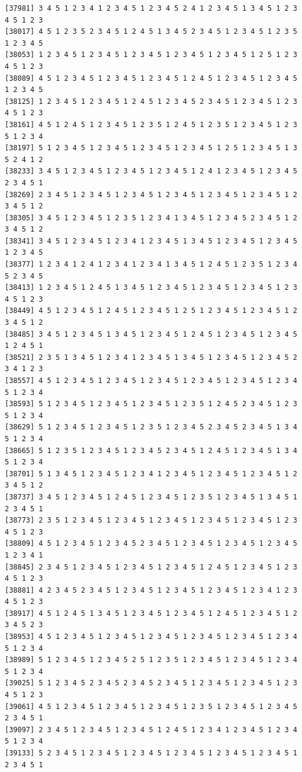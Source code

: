 \documentclass[
  english,
]{book}
\begin{document}
\begin{verbatim}
[37981] 3 4 5 1 2 3 4 1 2 3 4 5 1 2 3 4 5 2 4 1 2 3 4 5 1 3 4 5 1 2 3 4 5 1 2 3
[38017] 4 5 1 2 3 5 2 3 4 5 1 2 4 5 1 3 4 5 2 3 4 5 1 2 3 4 5 1 2 3 5 1 2 3 4 5
[38053] 1 2 3 4 5 1 2 3 4 5 1 2 3 4 5 1 2 3 4 5 1 2 3 4 5 1 2 5 1 2 3 4 5 1 2 3
[38089] 4 5 1 2 3 4 5 1 2 3 4 5 1 2 3 4 5 1 2 4 5 1 2 3 4 5 1 2 3 4 5 1 2 3 4 5
[38125] 1 2 3 4 5 1 2 3 4 5 1 2 4 5 1 2 3 4 5 2 3 4 5 1 2 3 4 5 1 2 3 4 5 1 2 3
[38161] 4 5 1 2 4 5 1 2 3 4 5 1 2 3 5 1 2 4 5 1 2 3 5 1 2 3 4 5 1 2 3 5 1 2 3 4
[38197] 5 1 2 3 4 5 1 2 3 4 5 1 2 3 4 5 1 2 3 4 5 1 2 5 1 2 3 4 5 1 3 5 2 4 1 2
[38233] 3 4 5 1 2 3 4 5 1 2 3 4 5 1 2 3 4 5 1 2 4 1 2 3 4 5 1 2 3 4 5 2 3 4 5 1
[38269] 2 3 4 5 1 2 3 4 5 1 2 3 4 5 1 2 3 4 5 1 2 3 4 5 1 2 3 4 5 1 2 3 4 5 1 2
[38305] 3 4 5 1 2 3 4 5 1 2 3 5 1 2 3 4 1 3 4 5 1 2 3 4 5 2 3 4 5 1 2 3 4 5 1 2
[38341] 3 4 5 1 2 3 4 5 1 2 3 4 1 2 3 4 5 1 3 4 5 1 2 3 4 5 1 2 3 4 5 1 2 3 4 5
[38377] 1 2 3 4 1 2 4 1 2 3 4 1 2 3 4 1 3 4 5 1 2 4 5 1 2 3 5 1 2 3 4 5 2 3 4 5
[38413] 1 2 3 4 5 1 2 4 5 1 3 4 5 1 2 3 4 5 1 2 3 4 5 1 2 3 4 5 1 2 3 4 5 1 2 3
[38449] 4 5 1 2 3 4 5 1 2 4 5 1 2 3 4 5 1 2 5 1 2 3 4 5 1 2 3 4 5 1 2 3 4 5 1 2
[38485] 3 4 5 1 2 3 4 5 1 3 4 5 1 2 3 4 5 1 2 4 5 1 2 3 4 5 1 2 3 4 5 1 2 4 5 1
[38521] 2 3 5 1 3 4 5 1 2 3 4 1 2 3 4 5 1 3 4 5 1 2 3 4 5 1 2 3 4 5 2 3 4 1 2 3
[38557] 4 5 1 2 3 4 5 1 2 3 4 5 1 2 3 4 5 1 2 3 4 5 1 2 3 4 5 1 2 3 4 5 1 2 3 4
[38593] 5 1 2 3 4 5 1 2 3 4 5 1 2 3 4 5 1 2 3 5 1 2 4 5 2 3 4 5 1 2 3 5 1 2 3 4
[38629] 5 1 2 3 4 5 1 2 3 4 5 1 2 3 5 1 2 3 4 5 2 3 4 5 2 3 4 5 1 3 4 5 1 2 3 4
[38665] 5 1 2 3 5 1 2 3 4 5 1 2 3 4 5 2 3 4 5 1 2 4 5 1 2 3 4 5 1 3 4 5 1 2 3 4
[38701] 5 1 3 4 5 1 2 3 4 5 1 2 3 4 1 2 3 4 5 1 2 3 4 5 1 2 3 4 5 1 2 3 4 5 1 2
[38737] 3 4 5 1 2 3 4 5 1 2 4 5 1 2 3 4 5 1 2 3 5 1 2 3 4 5 1 3 4 5 1 2 3 4 5 1
[38773] 2 3 5 1 2 3 4 5 1 2 3 4 5 1 2 3 4 5 1 2 3 4 5 1 2 3 4 5 1 2 3 4 5 1 2 3
[38809] 4 5 1 2 3 4 5 1 2 3 4 5 2 3 4 5 1 2 3 4 5 1 2 3 4 5 1 2 3 4 5 1 2 3 4 1
[38845] 2 3 4 5 1 2 3 4 5 1 2 3 4 5 1 2 3 4 5 1 2 4 5 1 2 3 4 5 1 2 3 4 5 1 2 3
[38881] 4 2 3 4 5 2 3 4 5 1 2 3 4 5 1 2 3 4 5 1 2 3 4 5 1 2 3 4 1 2 3 4 5 1 2 3
[38917] 4 5 1 2 4 5 1 3 4 5 1 2 3 4 5 1 2 3 4 5 1 2 4 5 1 2 3 4 5 1 2 3 4 5 2 3
[38953] 4 5 1 2 3 4 5 1 2 3 4 5 1 2 3 4 5 1 2 3 4 5 1 2 3 4 5 1 2 3 4 5 1 2 3 4
[38989] 5 1 2 3 4 5 1 2 3 4 5 2 5 1 2 3 5 1 2 3 4 5 1 2 3 4 5 1 2 3 4 5 1 2 3 4
[39025] 5 1 2 3 4 5 2 3 4 5 2 3 4 5 2 3 4 5 1 2 3 4 5 1 2 3 4 5 1 2 3 4 5 1 2 3
[39061] 4 5 1 2 3 4 5 1 2 3 4 5 1 2 3 4 5 1 2 3 5 1 2 3 4 5 1 2 3 4 5 2 3 4 5 1
[39097] 2 3 4 5 1 2 3 4 5 1 2 3 4 5 1 2 4 5 1 2 3 4 1 2 3 4 5 1 2 3 4 5 1 2 3 4
[39133] 5 2 3 4 5 1 2 3 4 5 1 2 3 4 5 1 2 3 4 5 1 2 3 4 5 1 2 3 4 5 1 2 3 4 5 1

\end{verbatim}
\end{document}

